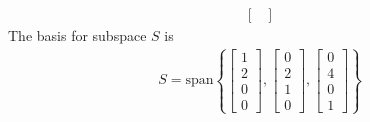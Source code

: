 \documentclass[letterpaper,12pt]{article}
\begin{document}
\begin{enumerate}
\begin{align*}
\begin{bmatrix}
      \end{bmatrix}
    \end{align*}
    The basis for subspace $S$ is
    \begin{align*}
      S = \text{span}\left\{
        \begin{bmatrix}
          1 \\ 2 \\ 0 \\ 0
        \end{bmatrix},
        \begin{bmatrix}
          0 \\ 2 \\ 1 \\ 0
        \end{bmatrix},
        \begin{bmatrix}
          0 \\ 4 \\ 0 \\ 1
        \end{bmatrix}
      \right\}
    \end{align*}

\end{enumerate}
\end{document}
